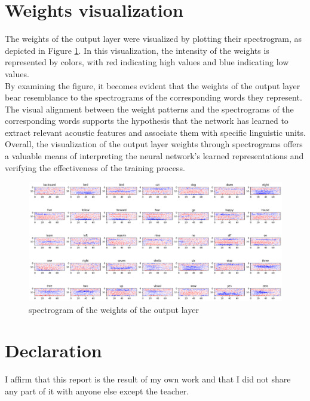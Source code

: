 \documentclass{class}
\begin{document}
\section{Weights visualization}
The weights of the output layer were visualized by plotting their spectrogram, as depicted in Figure \ref{fig-10}.
In this visualization, the intensity of the weights is represented by colors, with red indicating high values and blue indicating low values. \\
By examining the figure, it becomes evident that the weights of the output layer bear resemblance to the spectrograms of the corresponding words they represent.
The visual alignment between the weight patterns and the spectrograms of the corresponding words supports the hypothesis that
the network has learned to extract relevant acoustic features and associate them with specific linguistic units. \\
Overall, the visualization of the output layer weights through spectrograms offers a valuable means of interpreting the neural network's
learned representations and verifying the effectiveness of the training process.

\begin{figure}[H]
  \centering
  \includegraphics[width=\columnwidth]{images/spectrogram_weights.png}
  \caption{spectrogram of the weights of the output layer}
  \label{fig-10}
\end{figure}

\section{Declaration}
I affirm that this report is the result of my own work and that I did not share any part of it with anyone
else except the teacher.
\end{document}
